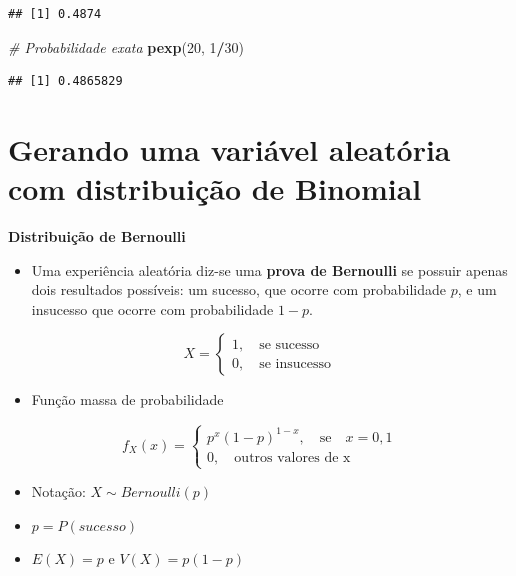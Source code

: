 \documentclass[
]{book}
\newenvironment{Shaded}{\begin{snugshade}}{\end{snugshade}}
\newcommand{\CommentTok}[1]{\textcolor[rgb]{0.56,0.35,0.01}{\textit{#1}}}
\newcommand{\DecValTok}[1]{\textcolor[rgb]{0.00,0.00,0.81}{#1}}
\newcommand{\FunctionTok}[1]{\textcolor[rgb]{0.13,0.29,0.53}{\textbf{#1}}}
\newcommand{\NormalTok}[1]{#1}
\newcommand{\SpecialCharTok}[1]{\textcolor[rgb]{0.81,0.36,0.00}{\textbf{#1}}}
\providecommand{\tightlist}{%
  \setlength{\itemsep}{0pt}\setlength{\parskip}{0pt}}
\begin{document}
\begin{verbatim}
## [1] 0.4874
\end{verbatim}

\begin{Shaded}
\begin{Highlighting}[]
\CommentTok{\# Probabilidade exata}
\FunctionTok{pexp}\NormalTok{(}\DecValTok{20}\NormalTok{, }\DecValTok{1}\SpecialCharTok{/}\DecValTok{30}\NormalTok{)}
\end{Highlighting}
\end{Shaded}

\begin{verbatim}
## [1] 0.4865829
\end{verbatim}

\section{Gerando uma variável aleatória com distribuição de Binomial}\label{gerando-uma-variuxe1vel-aleatuxf3ria-com-distribuiuxe7uxe3o-de-binomial}

\textbf{Distribuição de Bernoulli}

\begin{itemize}
\tightlist
\item
  Uma experiência aleatória diz-se uma \textbf{prova de Bernoulli} se
  possuir apenas dois resultados possíveis: um sucesso, que ocorre com
  probabilidade \(p\), e um insucesso que ocorre com probabilidade
  \(1-p\).
\end{itemize}

\[X =
\begin{cases}
1, \quad \text{se sucesso} \\
0, \quad \text{se insucesso}
\end{cases}\]

\begin{itemize}
\tightlist
\item
  Função massa de probabilidade
\end{itemize}

\[f_{X}(x) = \begin{cases}
p^{x}(1-p)^{1-x}, \quad \text{se} \quad x=0,1 \\
0, \quad \text{outros valores de x}
\end{cases}\]

\begin{itemize}
\item
  Notação: \(X \sim Bernoulli(p)\)
\item
  \(p=P(sucesso)\)
\item
  \(E(X)=p\) e \(V(X)=p(1-p)\)
\end{itemize}
\end{document}
